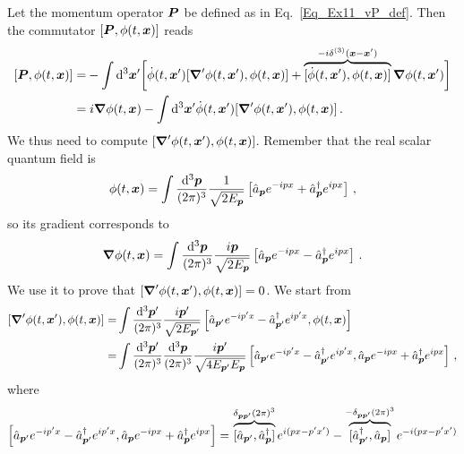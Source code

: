 \begin{sol}
    Let the momentum operator $\boldsymbol{P}$ be defined as in Eq.~\eqref{Eq_Ex11_vP_def}. Then the commutator $[\boldsymbol{P}, \phi(t,\boldsymbol{x})]$ reads
    \begin{equation}
    \begin{split}
        [\boldsymbol{P}, \phi(t,\boldsymbol{x})] 
        = & - \int {\rm d}^3\boldsymbol{x}' \bigg[\dot{\phi}(t,\boldsymbol{x}') [\boldsymbol{\nabla}' \phi(t,\boldsymbol{x}') , \phi(t,\boldsymbol{x})] + \overbrace{[\dot{\phi}(t,\boldsymbol{x}'), \phi(t,\boldsymbol{x})]}^{-i \delta^{(3)}(\boldsymbol{x} - \boldsymbol{x}')} \boldsymbol{\nabla} \phi(t,\boldsymbol{x}')\bigg] \\
        = &\; i \boldsymbol{\nabla} \phi(t,\boldsymbol{x}) - \int {\rm d}^3\boldsymbol{x}' \dot{\phi}(t,\boldsymbol{x}') [\boldsymbol{\nabla}' \phi(t,\boldsymbol{x}') , \phi(t,\boldsymbol{x})] \, . 
    \end{split}
    \end{equation}
    We thus need to compute $[\boldsymbol{\nabla}' \phi(t,\boldsymbol{x}') , \phi(t,\boldsymbol{x})]$. Remember that the real scalar quantum field is
    \begin{equation}
        \phi(t,\boldsymbol{x}) = \int \frac{{\rm d}^3\boldsymbol{p}}{(2\pi)^3} \frac{1}{\sqrt{2E_{\boldsymbol{p}}}} \left[\hat{a}_{\boldsymbol{p}} e^{-i p x} + \hat{a}^\dagger_{\boldsymbol{p}} e^{i p  x}\right] \, ,
    \end{equation}
    so its gradient corresponds to
    \begin{equation}
        \boldsymbol{\nabla} \phi(t,\boldsymbol{x}) = \int \frac{{\rm d}^3\boldsymbol{p}}{(2\pi)^3} \frac{i \boldsymbol{p}}{\sqrt{2E_{\boldsymbol{p}}}} \left[\hat{a}_{\boldsymbol{p}} e^{-i p  x} - \hat{a}^\dagger_{\boldsymbol{p}} e^{i p  x}\right] \, .
    \end{equation}
    We use it to prove that $[\boldsymbol{\nabla}' \phi(t,\boldsymbol{x}') , \phi(t,\boldsymbol{x})] = 0$. We start from
    \begin{equation}
    \begin{split}
        [\boldsymbol{\nabla}' \phi(t,\boldsymbol{x}') , \phi(t,\boldsymbol{x})] = & \int \frac{{\rm d}^3\boldsymbol{p}'}{(2\pi)^3} \frac{i \boldsymbol{p}'}{\sqrt{2E_{\boldsymbol{p}'}}} \left[\hat{a}_{\boldsymbol{p}'} e^{-i p' x} - \hat{a}^\dagger_{\boldsymbol{p}'} e^{i p'  x} , \phi(t,\boldsymbol{x})\right] \\
        = & \int \frac{{\rm d}^3\boldsymbol{p}'}{(2\pi)^3} \frac{{\rm d}^3\boldsymbol{p}}{(2\pi)^3} \frac{i \boldsymbol{p}'}{\sqrt{4E_{\boldsymbol{p}'} E_{\boldsymbol{p}}}} \left[\hat{a}_{\boldsymbol{p}'} e^{-i p'  x} - \hat{a}^\dagger_{\boldsymbol{p}'} e^{i p'  x} , \hat{a}_{\boldsymbol{p}} e^{-i p  x} + \hat{a}^\dagger_{\boldsymbol{p}} e^{i p  x}\right] \, ,
    \end{split}
    \end{equation}
    where
    \begin{equation}
    \begin{split}
        \left[\ades_{\vp'} e^{-i p' x} - \acon_{\vp'} e^{i p' x} , \ades_{\vp} e^{-i p x} + \acon_{\vp} e^{i p  x}\right] = & \, \overbrace{[\ades_{\vp'}, \acon_{\vp}]}^{\delta_{\vp \vp'} (2\pi)^3} e^{i(p x - p'  x')} - \overbrace{[\acon_{\vp'}, \ades_{\vp}]}^{-\delta_{\vp \vp'} (2\pi)^3} e^{-i(p x - p'  x')} \\

\end{split}
\end{equation}
\end{sol}
